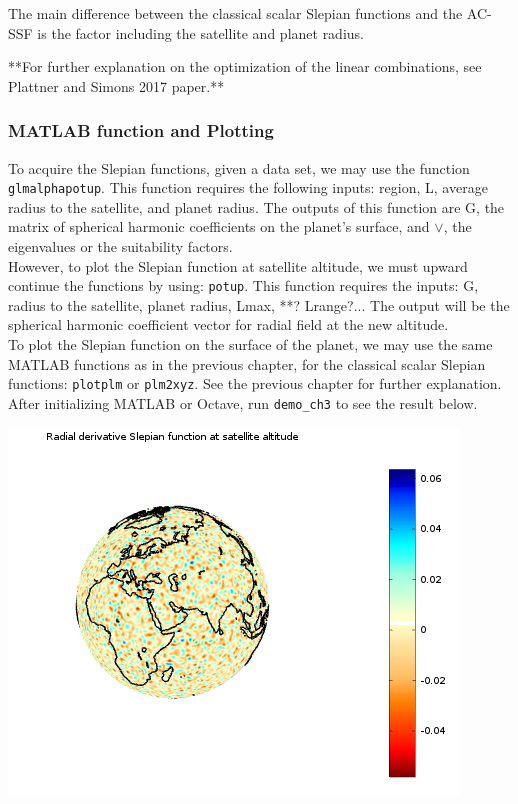 \documentclass[11pt]{article}
\begin{document}
The main difference between the classical scalar Slepian functions and the AC-SSF is the factor including the satellite and planet radius.  

**For further explanation on the optimization of the linear combinations, see Plattner and Simons 2017 paper.**

\subsubsection*{MATLAB function and Plotting}

To acquire the Slepian functions, given a data set, we may use the function \verb+glmalphapotup+.  This function requires the following inputs: region, L, average radius to the satellite, and planet radius.  The outputs of this function are G, the matrix of spherical harmonic coefficients on the planet's surface, and $\vee$, the eigenvalues or the suitability factors. \\

However, to plot the Slepian function at satellite altitude, we must upward continue the functions by using: \verb+potup+.  This function requires the inputs: G, radius to the satellite, planet radius, Lmax, **? Lrange?...  The output will be the spherical harmonic coefficient vector for radial field at the new altitude. \\

To plot the Slepian function on the surface of the planet, we may use the same MATLAB functions as in the previous chapter, for the classical scalar Slepian functions: \verb+plotplm+ or \verb+plm2xyz+.  See the previous chapter for further explanation. \\

After initializing MATLAB or Octave, run \verb+demo_ch3+ to see the result below.

\begin{center}
\includegraphics[scale=0.5]{ch3fig1.png}
\end{center}
\end{document}
